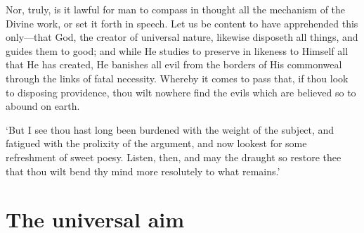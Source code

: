 \documentclass[12pt]{book}
\begin{document}
Nor, truly, is it lawful for man to compass in thought all the mechanism
of the Divine work, or set it forth in speech. Let us be content to
have apprehended this only---that God, the creator of universal nature,
likewise disposeth all things, and guides them to good; and while He
studies to preserve in likeness to Himself all that He has created, He
banishes all evil from the borders of His commonweal through the links
of fatal necessity. Whereby it comes to pass that, if thou look to
disposing providence, thou wilt nowhere find the evils which are
believed so to abound on earth.

`But I see thou hast long been burdened with the weight of the subject,
and fatigued with the prolixity of the argument, and now lookest for
some refreshment of sweet poesy. Listen, then, and may the draught so
restore thee that thou wilt bend thy mind more resolutely to what
remains.'




\section{The universal aim}
\end{document}

